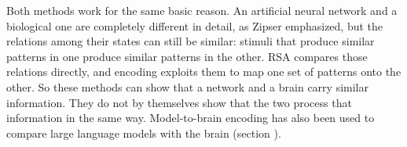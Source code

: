 %

Both methods work for the same basic reason. An artificial neural network and a biological one are completely different in detail, as Zipser emphasized, but the relations among their states can still be similar: stimuli that produce similar patterns in one produce similar patterns in the other. RSA compares those relations directly, and encoding exploits them to map one set of patterns onto the other. So these methods can show that a network and a brain carry similar information. They do not by themselves show that the two process that information in the same way. Model-to-brain encoding has also been used to compare large language models with the brain (section ).


